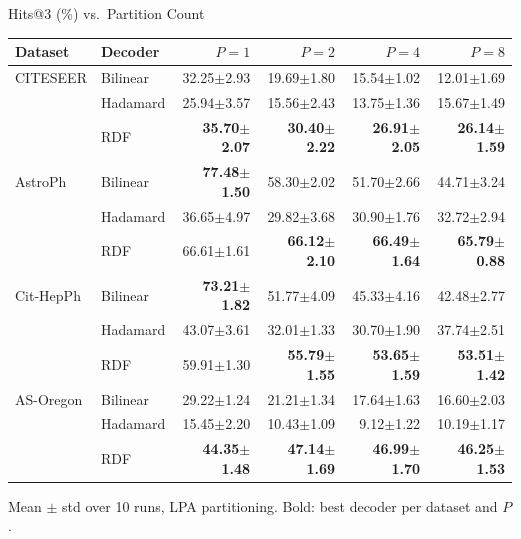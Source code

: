 \documentclass[aspectratio=169]{beamer}
\begin{document}
\begin{frame}{Hits@3 (\%) vs.\ Partition Count}
  \scriptsize
  \begin{tabular}{llrrrr}
    \toprule
    Dataset & Decoder & $P{=}1$ & $P{=}2$ & $P{=}4$ & $P{=}8$ \\
    \midrule
    CITESEER  & Bilinear  & 32.25$\pm$2.93 & 19.69$\pm$1.80 & 15.54$\pm$1.02 & 12.01$\pm$1.69 \\
              & Hadamard  & 25.94$\pm$3.57 & 15.56$\pm$2.43 & 13.75$\pm$1.36 & 15.67$\pm$1.49 \\
              & RDF       & \textbf{35.70$\pm$2.07} & \textbf{30.40$\pm$2.22} & \textbf{26.91$\pm$2.05} & \textbf{26.14$\pm$1.59} \\
    \midrule
    AstroPh   & Bilinear  & \textbf{77.48$\pm$1.50} & 58.30$\pm$2.02 & 51.70$\pm$2.66 & 44.71$\pm$3.24 \\
              & Hadamard  & 36.65$\pm$4.97 & 29.82$\pm$3.68 & 30.90$\pm$1.76 & 32.72$\pm$2.94 \\
              & RDF       & 66.61$\pm$1.61 & \textbf{66.12$\pm$2.10} & \textbf{66.49$\pm$1.64} & \textbf{65.79$\pm$0.88} \\
    \midrule
    Cit-HepPh & Bilinear  & \textbf{73.21$\pm$1.82} & 51.77$\pm$4.09 & 45.33$\pm$4.16 & 42.48$\pm$2.77 \\
              & Hadamard  & 43.07$\pm$3.61 & 32.01$\pm$1.33 & 30.70$\pm$1.90 & 37.74$\pm$2.51 \\
              & RDF       & 59.91$\pm$1.30 & \textbf{55.79$\pm$1.55} & \textbf{53.65$\pm$1.59} & \textbf{53.51$\pm$1.42} \\
    \midrule
    AS-Oregon & Bilinear  & 29.22$\pm$1.24 & 21.21$\pm$1.34 & 17.64$\pm$1.63 & 16.60$\pm$2.03 \\
              & Hadamard  & 15.45$\pm$2.20 & 10.43$\pm$1.09 & 9.12$\pm$1.22 & 10.19$\pm$1.17 \\
              & RDF       & \textbf{44.35$\pm$1.48} & \textbf{47.14$\pm$1.69} & \textbf{46.99$\pm$1.70} & \textbf{46.25$\pm$1.53} \\
    \bottomrule
  \end{tabular}

  \vspace{0.5em}
  \scriptsize Mean $\pm$ std over 10 runs, LPA partitioning. Bold: best decoder per dataset and $P$.
\end{frame}
\end{document}

